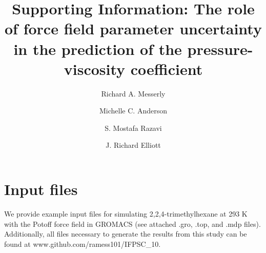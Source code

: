 \documentclass[preprint,review,11pt]{elsarticle}
\begin{document}
	
	\begin{frontmatter}
		
		
		
		\title{Supporting Information: The role of force field parameter uncertainty in the prediction of the pressure-viscosity coefficient}
		
		
		\author{Richard A. Messerly}
		\address{Thermodynamics Research Center, National Institute of Standards and Technology, Boulder, Colorado, 80305}
		
		\author{Michelle C. Anderson}
		\address{Thermodynamics Research Center, National Institute of Standards and Technology, Boulder, Colorado, 80305}
		
		\author{S. Mostafa Razavi}
		\address{Department of Chemical and Biomolecular Engineering, The University of Akron, Akron, Ohio, 44325-3906}
		
		\author{J. Richard Elliott}
		\address{Department of Chemical and Biomolecular Engineering, The University of Akron, Akron, Ohio, 44325-3906}
				
	\end{frontmatter}	
		
	\section{Input files} \label{SI:Gromacs input files}
	
	We provide example input files for simulating 2,2,4-trimethylhexane at 293 K with the Potoff force field in GROMACS (see attached .gro, .top, and .mdp files). Additionally, all files necessary to generate the results from this study can be found at \newline www.github.com/ramess101/IFPSC\_10.
	
\end{document}
